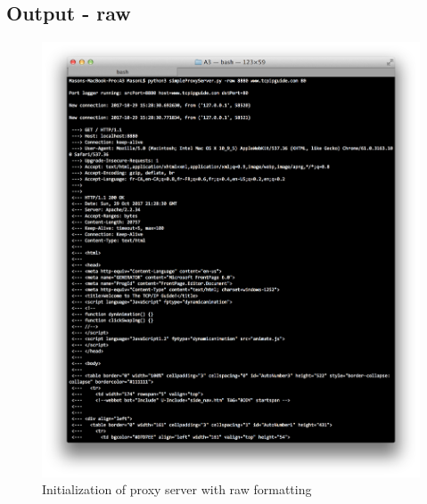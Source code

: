 \documentclass[11pt]{article}
\begin{document}
	\subsection{Output - raw}
	\begin{figure}[H]
	\includegraphics[scale=0.5, trim={0cm 0cm 0cm 0cm}, clip]{raw_output}
	\caption{Initialization of proxy server with raw formatting}
	\end{figure}
\end{document}
